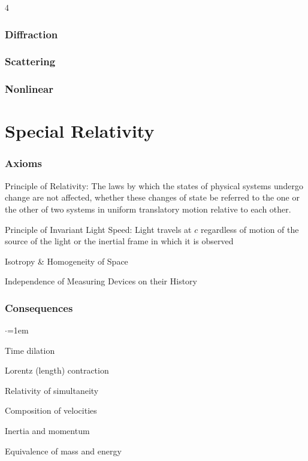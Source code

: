 \documentclass[letterpaper,landscape,10pt]{article}
\newenvironment{mydescription}
{\begin{description}
	\setlength{\itemsep}{0pt}
	\setlength{\parskip}{0pt}
	\setlength{\parsep}{-1pt}}
{\end{description}}
\newenvironment{titemize}
{\begin{list}{$\cdot$}{\leftmargin=1em}
	\setlength{\itemsep}{0pt}
	\setlength{\parskip}{0pt}
	\setlength{\parsep}{0pt}}
{\end{list}}
\begin{document}
{\begin{multicols}{4}
  \subsubsection*{Diffraction}
  	
  \subsubsection*{Scattering}

  \subsubsection*{Nonlinear}

\section*{Special Relativity}
  \subsubsection*{Axioms}
		\begin{mydescription}
			\item[Principle of Relativity:] The laws by which the states of
			  physical systems undergo change are not affected, whether these
			  changes of state be referred to the one or the other of two
			  systems in uniform translatory motion relative to each other.\\
			\item[Principle of Invariant Light Speed:] Light travels at $c$
			  regardless of motion of the source of the light or the inertial
			  frame in which it is observed \\
			\item[Isotropy \& Homogeneity of Space] \ \\
			\item[Independence of Measuring Devices on their History]
		\end{mydescription}
  \subsubsection*{Consequences}
		\begin{titemize}
			\item Time dilation
			\item Lorentz (length) contraction
			\item Relativity of simultaneity
			\item Composition of velocities
			\item Inertia and momentum
			\item Equivalence of mass and energy
		\end{titemize}


\end{multicols}}
\end{document}
